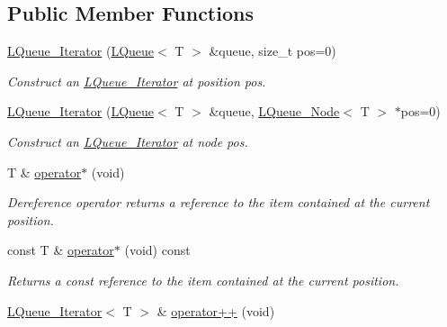 \subsection*{Public Member Functions}
\begin{DoxyCompactItemize}
\item 
\hyperlink{classMadara_1_1Utility_1_1LQueue__Iterator_ac5684b510cfe065e06684ce84b663f69}{LQueue\_\-Iterator} (\hyperlink{classMadara_1_1Utility_1_1LQueue}{LQueue}$<$ T $>$ \&queue, size\_\-t pos=0)
\begin{DoxyCompactList}\small\item\em Construct an \hyperlink{classMadara_1_1Utility_1_1LQueue__Iterator}{LQueue\_\-Iterator} at position pos. \item\end{DoxyCompactList}\item 
\hyperlink{classMadara_1_1Utility_1_1LQueue__Iterator_a7555e524eacb52485f3d24441444f0fe}{LQueue\_\-Iterator} (\hyperlink{classMadara_1_1Utility_1_1LQueue}{LQueue}$<$ T $>$ \&queue, \hyperlink{classMadara_1_1Utility_1_1LQueue__Node}{LQueue\_\-Node}$<$ T $>$ $\ast$pos=0)
\begin{DoxyCompactList}\small\item\em Construct an \hyperlink{classMadara_1_1Utility_1_1LQueue__Iterator}{LQueue\_\-Iterator} at node pos. \item\end{DoxyCompactList}\item 
T \& \hyperlink{classMadara_1_1Utility_1_1LQueue__Iterator_a0314b69be238ae2b209c7ea94856f180}{operator$\ast$} (void)
\begin{DoxyCompactList}\small\item\em Dereference operator returns a reference to the item contained at the current position. \item\end{DoxyCompactList}\item 
const T \& \hyperlink{classMadara_1_1Utility_1_1LQueue__Iterator_aeefe5a9935bd3e866e7fa33df5b438ba}{operator$\ast$} (void) const 
\begin{DoxyCompactList}\small\item\em Returns a const reference to the item contained at the current position. \item\end{DoxyCompactList}\item 
\hyperlink{classMadara_1_1Utility_1_1LQueue__Iterator}{LQueue\_\-Iterator}$<$ T $>$ \& \hyperlink{classMadara_1_1Utility_1_1LQueue__Iterator_a0666d5c195c9d8e9421d8453a9c6cf3d}{operator++} (void)

\end{DoxyCompactItemize}

